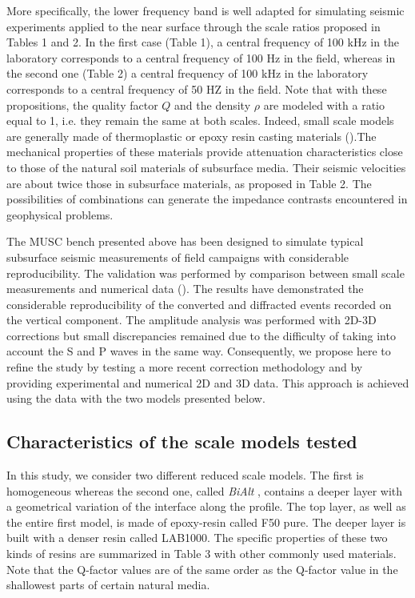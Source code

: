 \documentclass[extra,mreferee]{gji}
\newcommand{\bialt}{\textit{BiAlt} }
\begin{document}
{\color{magenta} More specifically,} the lower frequency band is well adapted for simulating seismic experiments applied to the near surface through the scale ratios proposed in Tables 1 and 2. In the first case (Table 1), a central frequency of 100 kHz in the laboratory corresponds to a central frequency of 100 Hz in the field, whereas in the second one (Table 2) a central frequency of 100 kHz in the laboratory corresponds to a central frequency of 50 HZ in the field. Note that with these propositions, the quality factor $Q$ and the density $\rho$ are modeled with a ratio equal to 1, i.e. they remain the same at both scales. Indeed, small scale models are generally made of thermoplastic or epoxy resin casting materials (\cite{bretaudeau2013fwi}).The mechanical properties of these materials provide attenuation characteristics close to those of the natural soil materials of subsurface media. Their seismic velocities are about twice those in subsurface materials, as proposed in Table 2. The possibilities of combinations can generate the impedance contrasts encountered in geophysical problems. 

The MUSC bench presented above has been designed to simulate typical subsurface seismic measurements of field campaigns with considerable reproducibility. The validation was performed by comparison between small scale measurements and numerical data (\cite{bretaudeau2011ssm}). The results have demonstrated the considerable reproducibility of the converted and diffracted events recorded on the vertical component. The amplitude analysis was performed with 2D-3D corrections but small discrepancies remained due to the difficulty of taking into account the S and P waves in the same way. Consequently, we propose here to refine the study by testing a more recent correction methodology \cite{schafer2014lss} and by providing experimental and numerical 2D and 3D data. This approach is achieved using the data with the two models presented below.

\subsection{Characteristics of the scale models tested}
\label{sec:models}

In this study, we consider two different reduced scale models. The first is homogeneous whereas the second one, called \bialt, contains a deeper layer with a geometrical variation of the interface along the profile. The top layer, as well as the entire first model, is made of epoxy-resin called F50 pure. The deeper layer is built with a denser resin called LAB1000. The specific properties of these two kinds of resins are summarized in Table 3 with other commonly used materials. Note that the Q-factor values are of the same order as the Q-factor value in the shallowest parts of certain natural media.
\end{document}
